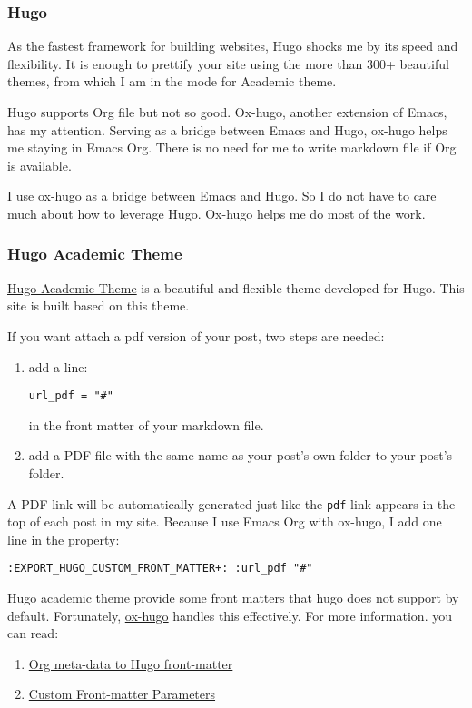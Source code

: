 \documentclass[koma,a4paper,captions=tableheading,11pt,listings-sv,microtype,paralist,colorlinks=true,urlcolor=blue,palatino]{org-article}
\begin{document}
\subsubsection{Hugo}
\label{sec:orgaed3855}


As the fastest framework for building websites, Hugo shocks me by its speed and
flexibility. It is enough to prettify your site using the more than 300+
beautiful themes, from which I am in the mode for Academic theme.

Hugo supports Org file but not so good. Ox-hugo, another extension of Emacs, has
my attention. Serving as a bridge between Emacs and Hugo, ox-hugo helps me
staying in Emacs Org. There is no need for me to write markdown file if Org is
available.

I use ox-hugo as a bridge between Emacs and Hugo. So I do not have to care much
about how to leverage Hugo. Ox-hugo helps me do most of the work.
\subsubsection{Hugo Academic Theme}
\label{sec:org7ca124e}


\href{https://github.com/gcushen/hugo-academic}{Hugo Academic Theme} is a beautiful and flexible theme developed for Hugo. This
site is built based on this theme.

If you want attach a pdf version of your post, two steps are needed:
\begin{enumerate}
\item add a line:
\begin{verbatim}
url_pdf = "#"
\end{verbatim}
in the front matter of your markdown file.
\item add a PDF file with the same name as your post’s own folder to your post’s
folder.
\end{enumerate}

A PDF link will be automatically generated just like the \texttt{pdf} link appears in
the top of each post in my site. Because I use Emacs Org with ox-hugo, I add one
line in the property:

\begin{verbatim}
:EXPORT_HUGO_CUSTOM_FRONT_MATTER+: :url_pdf "#"
\end{verbatim}

Hugo academic theme provide some front matters that hugo does not support by
default. Fortunately, \href{https://github.com/kaushalmodi/ox-hugo}{ox-hugo} handles this effectively. For more information.
you can read:
\begin{enumerate}
\item \href{https://ox-hugo.scripter.co/doc/org-meta-data-to-hugo-front-matter/}{Org meta-data to Hugo front-matter}
\item \href{https://ox-hugo.scripter.co/doc/custom-front-matter/}{Custom Front-matter Parameters}
\end{enumerate}
\end{document}
